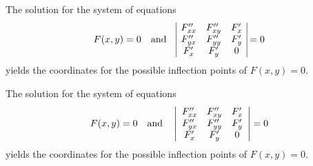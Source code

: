 \documentclass{article}
\begin{document}
    The solution for the system of equations
    \begin{equation}
        F(x,y)=0\quad \mbox{and}\quad
        \begin{array}{|*{2}{c@{\quad}}c|}
            F_{xx}'' & F_{xy}'' & F_{x}' \\
            F_{yx}'' & F_{yy}'' & F_{y}' \\
            F_{x}'   & F_{y}'   & 0 \\
        \end{array} = 0
    \end{equation}
    yields the coordinates for the possible inflection points of $F(x,y)=0$.

    The solution for the system of equations
    \begin{equation}
        F(x,y)=0\quad \mbox{and}\quad
        \left |
        \begin{array}{*{2}{c@{\quad}}c}
            F_{xx}'' & F_{xy}'' & F_{x}' \\
            F_{yx}'' & F_{yy}'' & F_{y}' \\
            F_{x}'   & F_{y}'   & 0 \\
        \end{array}
        \right | = 0
    \end{equation}
    yields the coordinates for the possible inflection points of $F(x,y)=0$.
\end{document}
